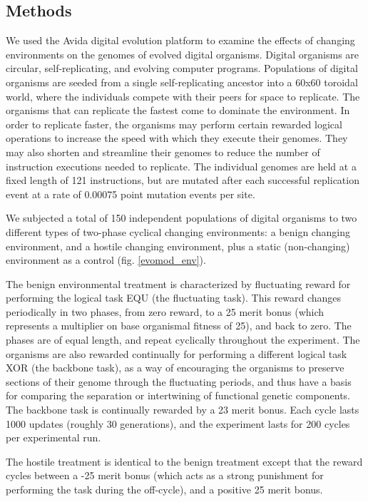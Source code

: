 \subsection{Methods}
We used the Avida digital evolution platform to examine the effects of changing environments on the genomes of evolved digital organisms. Digital organisms are circular, self-replicating, and evolving computer programs. Populations of digital organisms are seeded from a single self-replicating ancestor into a 60x60 toroidal world, where the individuals compete with their peers for space to replicate. The organisms that can replicate the fastest come to dominate the environment. In order to replicate faster, the organisms may perform certain rewarded logical operations to increase the speed with which they execute their genomes. They may also shorten and streamline their genomes to reduce the number of instruction executions needed to replicate. The individual genomes are held at a fixed length of 121 instructions, but are mutated after each successful replication event at a rate of 0.00075 point mutation events per site. 

We subjected a total of 150 independent populations of digital organisms to two different types of two-phase cyclical changing environments: a benign changing environment, and a hostile changing environment, plus a static (non-changing) environment as a control (fig. \ref{evomod_env}).

The benign environmental treatment is characterized by fluctuating reward for performing the logical task EQU (the fluctuating task). This reward changes periodically in two phases, from zero reward, to a 25 merit bonus (which represents a multiplier on base organismal fitness of 25), and back to zero. The phases are of equal length, and repeat cyclically throughout the experiment. The organisms are also rewarded continually for performing a different logical task XOR (the backbone task), as a way of encouraging the organisms to preserve sections of their genome through the fluctuating periods, and thus have a basis for comparing the separation or intertwining of functional genetic components. The backbone task is continually rewarded by a 23 merit bonus. Each cycle lasts 1000 updates (roughly 30 generations), and the experiment lasts for 200 cycles per experimental run.

The hostile treatment is identical to the benign treatment except that the reward cycles between a -25 merit bonus (which acts as a strong punishment for performing the task during the off-cycle), and a positive 25 merit bonus.

